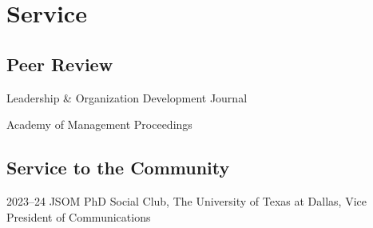 \documentclass[11pt,letterpaper]{report} %
\newcommand{\listitemspace}{0.2em}
\renewenvironment{itemize}
{\begin{list}{}{\setlength{\leftmargin}{0em}
                \setlength{\parskip}{0em}
                \setlength{\itemsep}{\listitemspace}
                \setlength{\parsep}{\listitemspace}}}
{\end{list}}
\begin{document}
    \section*{Service}


    \subsection*{Peer Review}

    \begin{itemize}

        \item Leadership \& Organization Development Journal
        
        \item Academy of Management Proceedings
        
    \end{itemize}


   \subsection*{Service to the Community}

   \begin{tablist}

       \item[2023--24] \tab{}JSOM PhD Social Club, The University of Texas at Dallas, Vice President of Communications

   \end{tablist}





\end{document}
